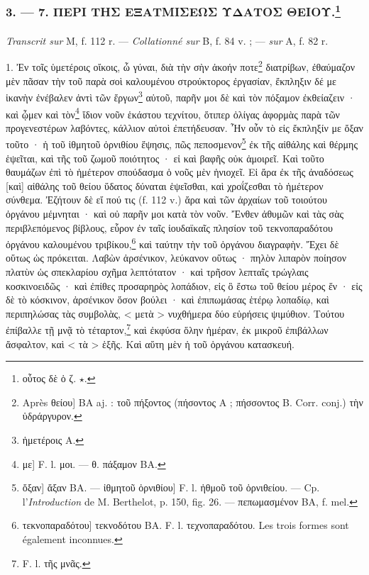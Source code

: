 \documentclass[landscape, a4paper, 11pt, oneside, polutonikogreek, french]{article}
\begin{document}
\subsubsection[3. --- 7. ΠΕΡΙ ΤΗΣ ΕΞΑΤΜΙΣΕΩΣ ΥΔΑΤΟΣ ΘΕΙΟΥ.]{3. --- 7. ΠΕΡΙ ΤΗΣ ΕΞΑΤΜΙΣΕΩΣ ΥΔΑΤΟΣ ΘΕΙΟΥ.\footnote{οὗτος δὲ ὁ ζ. $\star$.}}
\paragraph{}
\emph{Transcrit sur} M, f. 112 r. --- \emph{Collationné sur} B, f. 84 v. ; --- \emph{sur} A, f. 82 r.

\bigskip

1. Ἐν τοῖς ὑμετέροις οἴκοις, ὦ γύναι, διὰ τὴν σὴν ἀκοήν ποτε\footnote{Après θείου] BA aj. : τοῦ πήξοντος (πήσοντος A ; πήσσοντος B. Corr. conj.) τὴν ὑδράργυρον.} διατρίβων, ἐθαύμαζον μὲν πᾶσαν τὴν τοῦ παρὰ σοὶ καλουμένου στρούκτορος ἐργασίαν, ἔκπληξιν δέ με ἱκανὴν ἐνέβαλεν ἀντὶ τῶν ἔργων\footnote{ἡμετέροις A.} αὐτοῦ, παρῆν μοι δὲ καὶ τὸν πόξαμον ἐκθείαζειν · καὶ ᾦμεν καὶ τὸν\footnote{με] F. l. μοι. --- θ. πάξαμον BA.} ἴδιον νοῦν ἑκάστου τεχνίτου, ὅτιπερ ὀλίγας ἀφορμὰς παρὰ τῶν προγενεστέρων λαβόντες, κάλλιον αὐτοὶ ἐπετήδευσαν. Ἦν οὖν τὸ εἰς ἔκπληξίν με ὄξαν τοῦτο · ἡ τοῦ ἰθμητοῦ ὀρνιθίου ἕψησις, πῶς πεποσμενον\footnote{ὄξαν] ἄξαν BA. --- ἰθμητοῦ ὀρνιθίου] F. l. ἠθμοῦ τοῦ ὀρνιθείου. --- Cp. l'\emph{Introduction} de M. Berthelot, p. 150, fig. 26. --- πεπωμασμένον BA, f. mel.} ἐκ τῆς αἰθάλης καὶ θέρμης ἑψεῖται, καὶ τῆς τοῦ ζωμοῦ ποιότητος · εἰ καὶ βαφῆς οὐκ ἀμοιρεῖ. Καὶ τοῦτο θαυμάζων ἐπὶ τὸ ἡμέτερον σπούδασμα ὁ νοῦς μὲν ἡνιοχεῖ. Εἰ ἄρα ἐκ τῆς ἀναδόσεως [καὶ] αἰθάλης τοῦ θείου ὕδατος δύναται ἑψεῖσθαι, καὶ χροΐζεσθαι τὸ ἡμέτερον σύνθεμα. Ἐζήτουν δὲ εἴ πού τις (f. 112 v.) ἄρα καὶ τῶν ἀρχαίων τοῦ τοιούτου ὀργάνου μέμνηται · καὶ οὐ παρῆν μοι κατὰ τὸν νοῦν. Ἔνθεν ἀθυμῶν καὶ τὰς σὰς περιβλεπόμενος βίβλους, εὗρον ἐν ταῖς ἰουδαϊκαῖς πλησίον τοῦ τεκνοπαραδότου ὀργάνου καλουμένου τριβίκου,\footnote{τεκνοπαραδότου] τεκνοδότου BA. F. l. τεχνοπαραδότου. Les trois formes sont également inconnues.} καὶ ταύτην τὴν τοῦ ὀργάνου διαγραφὴν. Ἔχει δὲ οὕτως ὡς πρόκειται. Λαβὼν ἀρσένικον, λεύκανον οὕτως · πηλὸν λιπαρὸν ποίησον πλατὺν ὡς σπεκλαρίου σχῆμα λεπτότατον · καὶ τρῆσον λεπταῖς τρώγλαις κοσκινοειδῶς · καὶ ἐπίθες προσαρηρὸς λοπάδιον, εἰς ὃ ἔστω τοῦ θείου μέρος ἕν · εἰς δὲ τὸ κόσκινον, ἀρσένικον ὅσον βούλει · καὶ ἐπιπωμάσας ἑτέρῳ λοπαδίῳ, καὶ περιπηλώσας τὰς συμβολὰς, < μετὰ > νυχθήμερα δύο εὑρήσεις ψιμύθιον. Τούτου ἐπίβαλλε τῇ μνᾷ τὸ τέταρτον,\footnote{F. l. τῆς μνᾶς.} καὶ ἐκφύσα ὅλην ἡμέραν, ἐκ μικροῦ ἐπιβάλλων ἄσφαλτον, καὶ < τὰ > ἑξῆς. Καὶ αὕτη μὲν ἡ τοῦ ὁργάνου κατασκευή.
\end{document}
